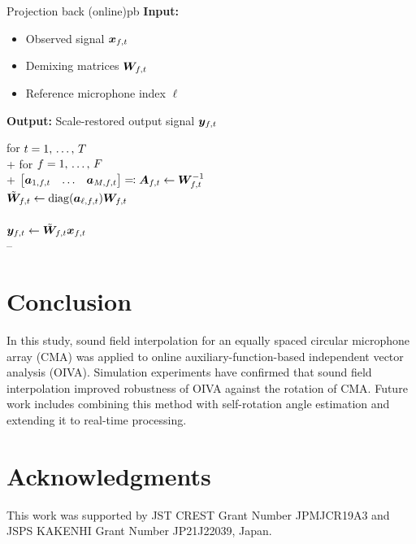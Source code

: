 \documentclass[twocolumn,9pt,dvipdfmx]{article}
\begin{document}
\begin{algorithm}{Projection back (online)}{pb}
  \textbf{Input:}
    \begin{itemize}
      \item Observed signal $\Obs _{\ft}$
      \item Demixing matrices $\Demix _{\ft}$
      \item Reference microphone index $\ell$
    \end{itemize}
  \textbf{Output:} Scale-restored output signal $\Est _{\ft}$
  \begin{pseudo}
    for $t = 1,\, \dots,\, T$ \\+
      for $f = 1,\, \dots,\, F$ \\+
        $\begin{bmatrix} \steer _{1,\ft} & \dots & \steer _{\Mic,\ft} \end{bmatrix} \eqqcolon \Steer _{\ft} \gets \Demix _{\ft} ^{-1}$ \\
        $\tilde{\Demix} _{\ft} \gets \mathrm{diag}(\steer _{\ell,\ft}) \Demix _{\ft}$ \\
         \\
        $\Est _{\ft} \gets \tilde{\Demix} _{\ft} \Obs _{\ft}$ \\--
  \end{pseudo}
\end{algorithm}

\section{Conclusion}
In this study, sound field interpolation for an equally spaced circular microphone array (CMA) was applied to online auxiliary-function-based independent vector analysis (OIVA).
Simulation experiments have confirmed that sound field interpolation improved robustness of OIVA against the rotation of CMA.
Future work includes combining this method with self-rotation angle estimation \cite{Lian:2021:APSIPA} and extending it to real-time processing.

\section*{Acknowledgments}
This work was supported by JST CREST Grant Number \mbox{JPMJCR19A3} and JSPS KAKENHI Grant Number \mbox{JP21J22039}, Japan.

\clearpage\newpage


\end{document}
